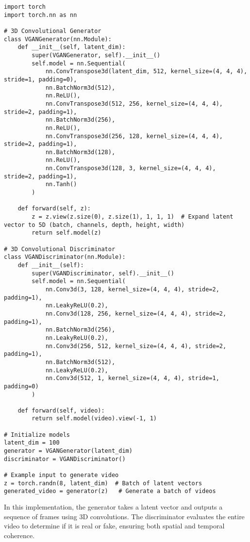 \begin{lstlisting}[style=python]
import torch
import torch.nn as nn

# 3D Convolutional Generator
class VGANGenerator(nn.Module):
    def __init__(self, latent_dim):
        super(VGANGenerator, self).__init__()
        self.model = nn.Sequential(
            nn.ConvTranspose3d(latent_dim, 512, kernel_size=(4, 4, 4), stride=1, padding=0),
            nn.BatchNorm3d(512),
            nn.ReLU(),
            nn.ConvTranspose3d(512, 256, kernel_size=(4, 4, 4), stride=2, padding=1),
            nn.BatchNorm3d(256),
            nn.ReLU(),
            nn.ConvTranspose3d(256, 128, kernel_size=(4, 4, 4), stride=2, padding=1),
            nn.BatchNorm3d(128),
            nn.ReLU(),
            nn.ConvTranspose3d(128, 3, kernel_size=(4, 4, 4), stride=2, padding=1),
            nn.Tanh()
        )

    def forward(self, z):
        z = z.view(z.size(0), z.size(1), 1, 1, 1)  # Expand latent vector to 5D (batch, channels, depth, height, width)
        return self.model(z)

# 3D Convolutional Discriminator
class VGANDiscriminator(nn.Module):
    def __init__(self):
        super(VGANDiscriminator, self).__init__()
        self.model = nn.Sequential(
            nn.Conv3d(3, 128, kernel_size=(4, 4, 4), stride=2, padding=1),
            nn.LeakyReLU(0.2),
            nn.Conv3d(128, 256, kernel_size=(4, 4, 4), stride=2, padding=1),
            nn.BatchNorm3d(256),
            nn.LeakyReLU(0.2),
            nn.Conv3d(256, 512, kernel_size=(4, 4, 4), stride=2, padding=1),
            nn.BatchNorm3d(512),
            nn.LeakyReLU(0.2),
            nn.Conv3d(512, 1, kernel_size=(4, 4, 4), stride=1, padding=0)
        )

    def forward(self, video):
        return self.model(video).view(-1, 1)

# Initialize models
latent_dim = 100
generator = VGANGenerator(latent_dim)
discriminator = VGANDiscriminator()

# Example input to generate video
z = torch.randn(8, latent_dim)  # Batch of latent vectors
generated_video = generator(z)   # Generate a batch of videos
\end{lstlisting}

In this implementation, the generator takes a latent vector and outputs a sequence of frames using 3D convolutions. The discriminator evaluates the entire video to determine if it is real or fake, ensuring both spatial and temporal coherence.

